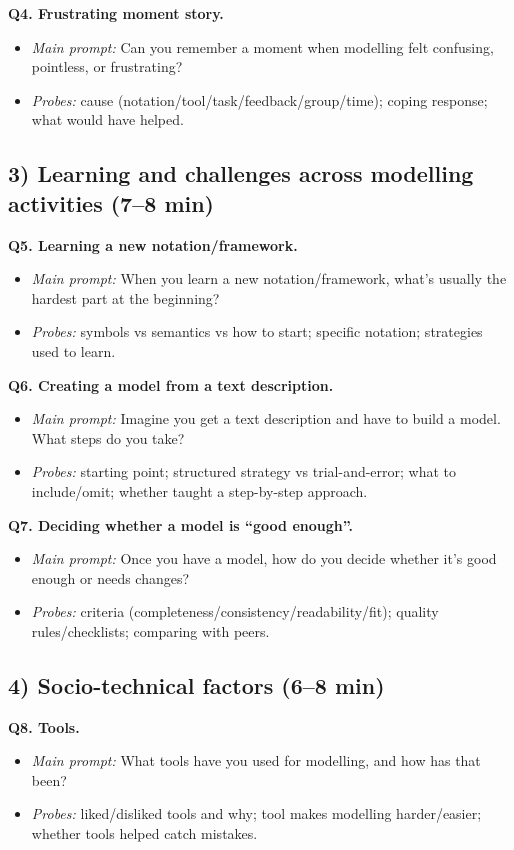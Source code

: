 \textbf{Q4. Frustrating moment story.}
\begin{itemize}
  \item \emph{Main prompt:} Can you remember a moment when modelling felt confusing, pointless, or frustrating?
  \item \emph{Probes:} cause (notation/tool/task/feedback/group/time); coping response; what would have helped.
\end{itemize}

\subsection*{3) Learning and challenges across modelling activities (7--8 min)}
\textbf{Q5. Learning a new notation/framework.}
\begin{itemize}
  \item \emph{Main prompt:} When you learn a new notation/framework, what’s usually the hardest part at the beginning?
  \item \emph{Probes:} symbols vs semantics vs how to start; specific notation; strategies used to learn.
\end{itemize}

\textbf{Q6. Creating a model from a text description.}
\begin{itemize}
  \item \emph{Main prompt:} Imagine you get a text description and have to build a model. What steps do you take?
  \item \emph{Probes:} starting point; structured strategy vs trial-and-error; what to include/omit; whether taught a step-by-step approach.
\end{itemize}

\textbf{Q7. Deciding whether a model is “good enough”.}
\begin{itemize}
  \item \emph{Main prompt:} Once you have a model, how do you decide whether it’s good enough or needs changes?
  \item \emph{Probes:} criteria (completeness/consistency/readability/fit); quality rules/checklists; comparing with peers.
\end{itemize}

\subsection*{4) Socio-technical factors (6--8 min)}
\textbf{Q8. Tools.}
\begin{itemize}
  \item \emph{Main prompt:} What tools have you used for modelling, and how has that been?
  \item \emph{Probes:} liked/disliked tools and why; tool makes modelling harder/easier; whether tools helped catch mistakes.
\end{itemize}

